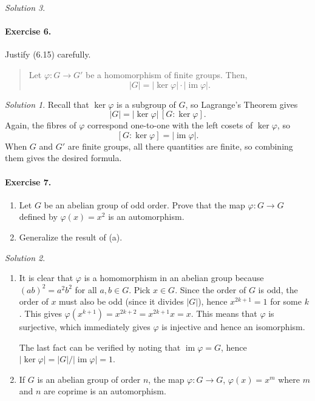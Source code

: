 \documentclass[11pt]{report}
\DeclareMathOperator\im{im}
\theoremstyle{remark}
\newtheorem*{solution}{Solution}
\begin{document}
\begin{solution}
    \paragraph{Exercise 6.} Justify (6.15) carefully.
    \begin{quote}
        Let $\varphi\colon G \to G'$ be a homomorphism of finite groups. Then, \[
            |G| = |\ker{\varphi}| \cdot |\im{\varphi}|. 
        \] 
    \end{quote}
    \begin{solution}
        Recall that $\ker{\varphi}$ is a subgroup of $G$, so Lagrange's Theorem
        gives \[
            |G| = |\ker{\varphi}|\,[G: \ker{\varphi}].
        \] Again, the fibres of $\varphi$ correspond one-to-one with the left cosets
        of $\ker\varphi$, so \[
            [G:\ker{\varphi}] = |\im{\varphi}|.
        \] When $G$ and $G'$ are finite groups, all there quantities are finite, so
        combining them gives the desired formula.
    \end{solution}
    
    \paragraph{Exercise 7.} \mbox{}
    \begin{enumerate}
        \itemsep0em    
        \item Let $G$ be an abelian group of odd order. Prove that the map
        $\varphi\colon G \to G$ defined by $\varphi(x) = x^2$ is an automorphism.
        \item Generalize the result of (a).
    \end{enumerate}
    \begin{solution} \mbox{}
    \begin{enumerate}
        \item It is clear that $\varphi$ is a homomorphism in an abelian group
        because $(ab)^2 = a^2 b^2$ for all $a, b \in G$.  Pick $x \in G$. Since the
        order of $G$ is odd, the order of $x$ must also be odd (since it divides
        $|G|$), hence $x^{2k + 1} = 1$ for some $k$.  This gives $\varphi(x^{k + 1})
        = x^{2k + 2} = x^{2k + 1}x = x$. This means that $\varphi$ is surjective,
        which immediately gives $\varphi$ is injective and hence an isomorphism.

        The last fact can be verified by noting that $\im{\varphi} = G$, hence
        $|\ker{\varphi}| = |G| / |\im{\varphi}| = 1$.

        \item If $G$ is an abelian group of order $n$, the map $\varphi\colon G \to
        G$, $\varphi(x) = x^m$ where $m$ and $n$ are coprime is an automorphism.
        

\end{enumerate}
\end{solution}
\end{solution}
\end{document}
